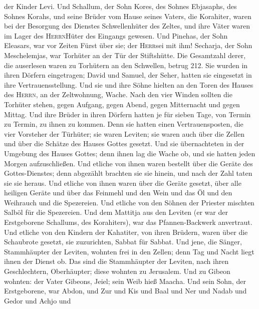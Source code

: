 der Kinder Levi.  Und Schallum, der Sohn Kores, des
Sohnes Ebjasaphs, des Sohnes Korahs, und seine Brüder vom Hause seines
Vaters, die Korahiter, waren bei der Besorgung des Dienstes
Schwellenhüter des Zeltes, und ihre Väter waren im Lager des
\textsc{Herrn}Hüter des Eingangs gewesen.  Und Pinehas,
der Sohn Eleasars, war vor Zeiten Fürst über sie; der \textsc{Herr}sei
mit ihm!  Secharja, der Sohn Meschelemjas, war Torhüter
an der Tür der Stiftshütte.  Die Gesamtzahl derer, die
auserlesen waren zu Torhütern an den Schwellen, betrug 212. Sie wurden
in ihren Dörfern eingetragen; David und Samuel, der Seher, hatten sie
eingesetzt in ihre Vertrauensstellung.  Und sie und ihre
Söhne hielten an den Toren des Hauses des \textsc{Herrn}, an der
Zeltwohnung, Wache.  Nach den vier Winden sollten die
Torhüter stehen, gegen Aufgang, gegen Abend, gegen Mitternacht und gegen
Mittag.  Und ihre Brüder in ihren Dörfern hatten je für
sieben Tage, von Termin zu Termin, zu ihnen zu kommen. 
Denn sie hatten einen Vertrauensposten, die vier Vorsteher der Türhüter;
sie waren Leviten; sie waren auch über die Zellen und über die Schätze
des Hauses Gottes gesetzt.  Und sie übernachteten in der
Umgebung des Hauses Gottes; denn ihnen lag die Wache ob, und sie hatten
jeden Morgen aufzuschließen.  Und etliche von ihnen waren
bestellt über die Geräte des Gottes-Dienstes; denn abgezählt brachten
sie sie hinein, und nach der Zahl taten sie sie heraus. 
Und etliche von ihnen waren über die Geräte gesetzt, über alle heiligen
Geräte und über das Feinmehl und den Wein und das Öl und den Weihrauch
und die Spezereien.  Und etliche von den Söhnen der
Priester mischten Salböl für die Spezereien.  Und dem
Mattitja aus den Leviten (er war der Erstgeborene Schallums, des
Korahiters), war das Pfannen-Backwerk anvertraut.  Und
etliche von den Kindern der Kahatiter, von ihren Brüdern, waren über die
Schaubrote gesetzt, sie zuzurichten, Sabbat für Sabbat. 
Und jene, die Sänger, Stammhäupter der Leviten, wohnten frei in den
Zellen; denn Tag und Nacht liegt ihnen der Dienst ob. 
Das sind die Stammhäupter der Leviten, nach ihren Geschlechtern,
Oberhäupter; diese wohnten zu Jerusalem.  Und zu Gibeon
wohnten: der Vater Gibeons, Jeiel; sein Weib hieß Maacha.
 Und sein Sohn, der Erstgeborene, war Abdon, und Zur und
Kis und Baal und Ner und Nadab  und Gedor und Achjo und
